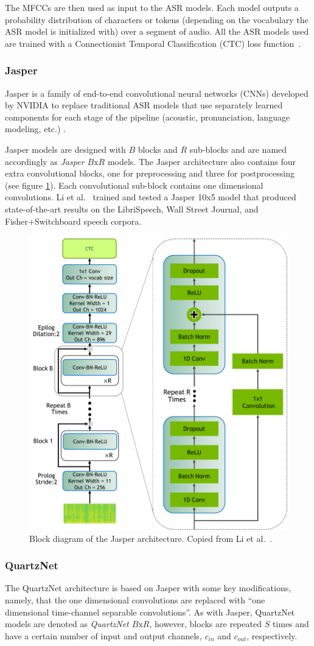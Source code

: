 \documentclass[12pt]{article}
\begin{document}
\noindent
The MFCCs are then used as input to the ASR models. Each model outputs a probability distribution of characters or tokens (depending on the vocabulary
the ASR model is initialized with) over a segment of audio. All the ASR models used are trained with a Connectionist Temporal Classification (CTC)
loss function~\cite{graves_connectionist_2006}.

\subsubsection{Jasper}\label{sec:jasper}
Jasper is a family of end-to-end convolutional neural networks (CNNs) developed by NVIDIA to replace traditional ASR models that use separately
learned components for each stage of the pipeline (acoustic, pronunciation, language modeling, etc.) \cite{li_jasper_2019}.

Jasper models are designed with $B$ blocks and $R$ sub-blocks and are named accordingly as \textit{Jasper $B\mbox{x}R$} models. The Jasper
architecture also contains four extra convolutional blocks, one for preprocessing and three for postprocessing (see figure \ref{fig:jasper}). Each
convolutional sub-block contains one dimensional convolutions. Li et al.~\cite{li_jasper_2019} trained and tested a Jasper 10x5 model that produced
state-of-the-art results on the LibriSpeech, Wall Street Journal, and Fisher+Switchboard speech corpora.

\begin{figure}
    \centering
    \includegraphics[width=0.5\linewidth]{figures/jasper_vertical.png}
    \caption{Block diagram of the Jasper architecture. Copied from Li et al.~\cite{li_jasper_2019}.}
    \label{fig:jasper}
\end{figure}

\subsubsection{QuartzNet}\label{sec:quartznet}
The QuartzNet architecture is based on Jasper with some key modifications, namely, that the one dimensional convolutions are replaced with ``one
dimensional time-channel separable convolutions''. As with Jasper, QuartzNet models are denoted as \textit{QuartzNet $B\mbox{x}R$}, however, blocks
are repeated $S$ times and have a certain number of input and output channels, $c_{in}$ and $c_{out}$, respectively.
\end{document}
